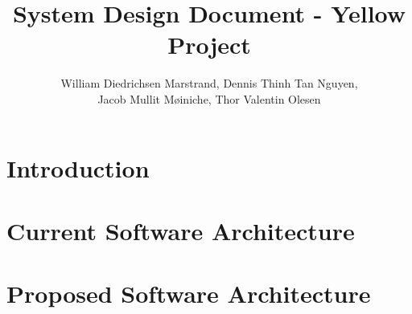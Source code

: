 \documentclass{article}
\title{System Design Document - Yellow Project}
\author{William Diedrichsen Marstrand, Dennis Thinh Tan Nguyen, 
\\Jacob Mullit Møiniche, Thor Valentin Olesen}
\begin{document}
\maketitle

\section{Introduction}
	
	
\section{Current Software Architecture}
\section{Proposed Software Architecture}
	
	
\end{document}
